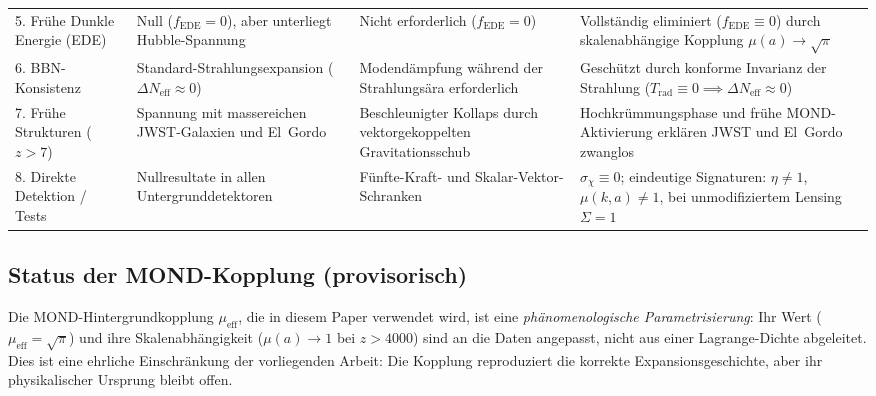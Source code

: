 \documentclass[aps,prd,twocolumn,superscriptaddress,nofootinbib,floatfix]{revtex4-2}
\begin{document}
\begin{table}[t]
\begin{tabular}{@{}llll@{}}
\addlinespace
\parbox[t]{0.17\textwidth}{\raggedright 5. Frühe Dunkle Energie (EDE)} &
\parbox[t]{0.25\textwidth}{\raggedright Null ($f_{\mathrm{EDE}} = 0$), aber unterliegt Hubble-Spannung} &
\parbox[t]{0.26\textwidth}{\raggedright Nicht erforderlich ($f_{\mathrm{EDE}} = 0$)} &
\parbox[t]{0.26\textwidth}{\raggedright Vollständig eliminiert ($f_{\mathrm{EDE}} \equiv 0$) durch skalenabhängige Kopplung $\mu(a) \to \sqrt{\pi}$} \\
\addlinespace
\parbox[t]{0.17\textwidth}{\raggedright 6. BBN-Konsistenz} &
\parbox[t]{0.25\textwidth}{\raggedright Standard-Strahlungsexpansion ($\Delta N_{\mathrm{eff}} \approx 0$)} &
\parbox[t]{0.26\textwidth}{\raggedright Modendämpfung während der Strahlungsära erforderlich} &
\parbox[t]{0.26\textwidth}{\raggedright Geschützt durch konforme Invarianz der Strahlung ($T_{\mathrm{rad}} \equiv 0 \implies \Delta N_{\mathrm{eff}} \approx 0$)} \\
\addlinespace
\parbox[t]{0.17\textwidth}{\raggedright 7. Frühe Strukturen ($z > 7$)} &
\parbox[t]{0.25\textwidth}{\raggedright Spannung mit massereichen JWST-Galaxien und El~Gordo} &
\parbox[t]{0.26\textwidth}{\raggedright Beschleunigter Kollaps durch vektorgekoppelten Gravitationsschub} &
\parbox[t]{0.26\textwidth}{\raggedright Hochkrümmungsphase und frühe MOND-Aktivierung erklären JWST und El~Gordo zwanglos} \\
\addlinespace
\parbox[t]{0.17\textwidth}{\raggedright 8. Direkte Detektion / Tests} &
\parbox[t]{0.25\textwidth}{\raggedright Nullresultate in allen Untergrunddetektoren} &
\parbox[t]{0.26\textwidth}{\raggedright Fünfte-Kraft- und Skalar-Vektor-Schranken} &
\parbox[t]{0.26\textwidth}{\raggedright $\sigma_{\chi} \equiv 0$; eindeutige Signaturen: $\eta \neq 1$, $\mu(k,a) \neq 1$, bei unmodifiziertem Lensing $\Sigma = 1$} \\
\bottomrule
\end{tabular}
\end{table}


\subsection{Status der MOND-Kopplung (provisorisch)}
\label{subsec:mond_status}

Die MOND-Hintergrundkopplung $\mu_{\mathrm{eff}}$, die in diesem Paper verwendet wird, ist eine \emph{phänomenologische Parametrisierung}: Ihr Wert ($\mu_{\mathrm{eff}} = \sqrt{\pi}$) und ihre Skalenabhängigkeit ($\mu(a) \to 1$ bei $z > 4000$) sind an die Daten angepasst, nicht aus einer Lagrange-Dichte abgeleitet. Dies ist eine ehrliche Einschränkung der vorliegenden Arbeit: Die Kopplung reproduziert die korrekte Expansionsgeschichte, aber ihr physikalischer Ursprung bleibt offen.
\end{document}
